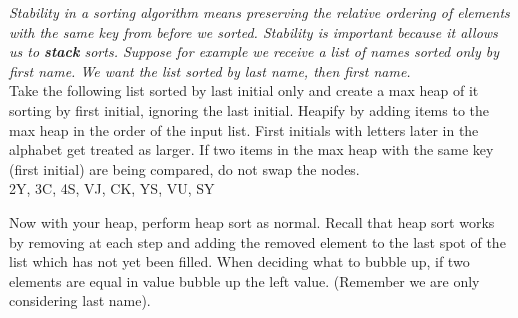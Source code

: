 \emph{Stability in a sorting algorithm means preserving the relative ordering of elements with the same key from before we sorted. Stability is important because it allows us to \textbf{stack} sorts. Suppose for example we receive a list of names sorted only by first name. We want the list sorted by last name, then first name.}\\

\question Take the following list sorted by last initial only and create a max heap of it sorting by first initial, ignoring the last initial. Heapify by adding items to the max heap in the order of the input list. First initials with letters later in the alphabet get treated as larger. If two items in the max heap with the same key (first initial) are being compared, do not swap the nodes. \\

2Y, 3C, 4S, VJ, CK, YS, VU, SY\\


\begin{solution}
\end{solution}

\question Now with your heap, perform heap sort as normal. Recall that heap sort works by removing at each step and adding the removed element to the last spot of the list which has not yet been filled. When deciding what to bubble up, if two elements are equal in value bubble up the left value. (Remember we are only considering last name).

